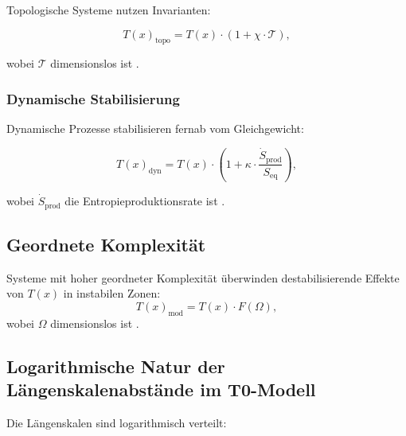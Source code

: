 \documentclass[12pt,a4paper]{article}
\newcommand{\Tfield}{T(x)}
\begin{document}
	Topologische Systeme nutzen Invarianten:
	
	\begin{equation}
		\Tfield_{\text{topo}} = \Tfield \cdot (1 + \chi \cdot \mathcal{T}),
	\end{equation}
	
	wobei $\mathcal{T}$ dimensionslos ist \cite{pascher_nateinheiten_2025}.
	
	\subsubsection{Dynamische Stabilisierung}
	
	Dynamische Prozesse stabilisieren fernab vom Gleichgewicht:
	
	\begin{equation}
		\Tfield_{\text{dyn}} = \Tfield \cdot \left(1 + \kappa \cdot \frac{\dot{S}_{\text{prod}}}{S_{\text{eq}}}\right),
	\end{equation}
	
	wobei $\dot{S}_{\text{prod}}$ die Entropieproduktionsrate ist \cite{pascher_nateinheiten_2025}.
	
	\subsection{Geordnete Komplexität}
	
	\begin{tcolorbox}[colback=blue!5!white,colframe=blue!75!black,title=Prinzip der geordneten Komplexität]
		Systeme mit hoher geordneter Komplexität überwinden destabilisierende Effekte von $\Tfield$ in instabilen Zonen:
		\begin{equation}
			\Tfield_{\text{mod}} = \Tfield \cdot F(\Omega),
		\end{equation}
		wobei $\Omega$ dimensionslos ist \cite{pascher_nateinheiten_2025}.
	\end{tcolorbox}
	
	\subsection{Logarithmische Natur der Längenskalenabstände im T0-Modell}
	
	Die Längenskalen sind logarithmisch verteilt:
	
\end{document}
